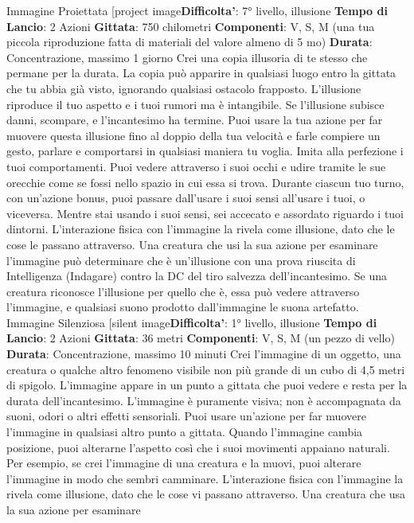 \begin{multicols}{2}
Immagine Proiettata
[project image\textbf{Difficolta'}:
7° livello, illusione
\textbf{Tempo di Lancio}: 2 Azioni
\textbf{Gittata}: 750 chilometri
\textbf{Componenti}: V, S, M (una tua piccola riproduzione
fatta di materiali del valore almeno di 5 mo)
\textbf{Durata}: Concentrazione, massimo 1 giorno
Crei una copia illusoria di te stesso che permane per la
durata. La copia può apparire in qualsiasi luogo entro la
gittata che tu abbia già visto, ignorando qualsiasi
ostacolo frapposto. L’illusione riproduce il tuo aspetto e
i tuoi rumori ma è intangibile. Se l’illusione subisce
danni, scompare, e l’incantesimo ha termine.
Puoi usare la tua azione per far muovere questa
illusione fino al doppio della tua velocità e farle
compiere un gesto, parlare e comportarsi in qualsiasi
maniera tu voglia. Imita alla perfezione i tuoi
comportamenti.
Puoi vedere attraverso i suoi occhi e udire tramite le
sue orecchie come se fossi nello spazio in cui essa si
trova. Durante ciascun tuo turno, con un’azione bonus,
puoi passare dall’usare i suoi sensi all’usare i tuoi, o
viceversa. Mentre stai usando i suoi sensi, sei accecato
e assordato riguardo i tuoi dintorni.
L’interazione fisica con l’immagine la rivela come
illusione, dato che le cose le passano attraverso. Una
creatura che usi la sua azione per esaminare
l’immagine può determinare che è un’illusione con una
prova riuscita di Intelligenza (Indagare) contro la DC del
tiro salvezza dell’incantesimo. Se una creatura
riconosce l’illusione per quello che è, essa può vedere
attraverso l’immagine, e qualsiasi suono prodotto
dall’immagine le suona artefatto.
Immagine Silenziosa
[silent image\textbf{Difficolta'}:
1° livello, illusione
\textbf{Tempo di Lancio}: 2 Azioni
\textbf{Gittata}: 36 metri
\textbf{Componenti}: V, S, M (un pezzo di vello)
\textbf{Durata}: Concentrazione, massimo 10 minuti
Crei l’immagine di un oggetto, una creatura o qualche
altro fenomeno visibile non più grande di un cubo di 4,5
metri di spigolo. L’immagine appare in un punto a
gittata che puoi vedere e resta per la durata
dell’incantesimo. L’immagine è puramente visiva; non è
accompagnata da suoni, odori o altri effetti sensoriali.
Puoi usare un’azione per far muovere l’immagine in
qualsiasi altro punto a gittata. Quando l’immagine
cambia posizione, puoi alterarne l’aspetto così che i
suoi movimenti appaiano naturali. Per esempio, se crei
l’immagine di una creatura e la muovi, puoi alterare
l’immagine in modo che sembri camminare.
L’interazione fisica con l’immagine la rivela come
illusione, dato che le cose vi passano attraverso. Una
creatura che usa la sua azione per esaminare

\end{multicols}

